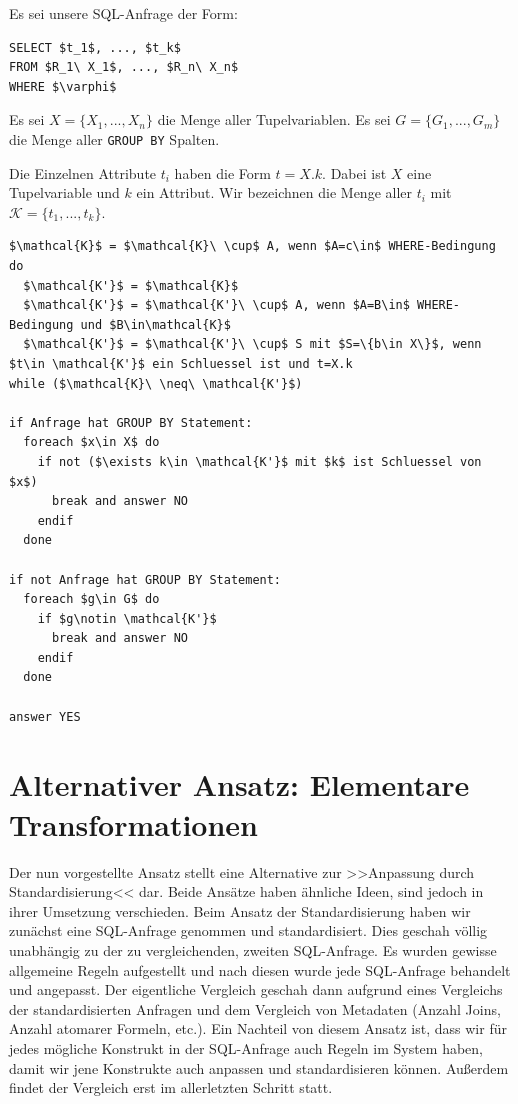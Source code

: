 Es sei unsere SQL-Anfrage der Form:

\begin{lstlisting}[mathescape]
SELECT $t_1$, ..., $t_k$
FROM $R_1\ X_1$, ..., $R_n\ X_n$
WHERE $\varphi$
\end{lstlisting}

Es sei $X=\{X_1, ..., X_n\}$ die Menge aller Tupelvariablen. Es sei $G=\{G_1, ..., G_m\}$ die Menge aller \verb|GROUP BY| Spalten.

Die Einzelnen Attribute $t_i$ haben die Form $t = X.k$. Dabei ist $X$ eine Tupelvariable und $k$ ein Attribut. Wir bezeichnen die Menge aller $t_i$ mit $\mathcal{K}=\{t_1,...,t_k\}$.

\begin{lstlisting}[mathescape]
$\mathcal{K}$ = $\mathcal{K}\ \cup$ A, wenn $A=c\in$ WHERE-Bedingung
do 
  $\mathcal{K'}$ = $\mathcal{K}$
  $\mathcal{K'}$ = $\mathcal{K'}\ \cup$ A, wenn $A=B\in$ WHERE-Bedingung und $B\in\mathcal{K}$
  $\mathcal{K'}$ = $\mathcal{K'}\ \cup$ S mit $S=\{b\in X\}$, wenn $t\in \mathcal{K'}$ ein Schluessel ist und t=X.k
while ($\mathcal{K}\ \neq\ \mathcal{K'}$)

if Anfrage hat GROUP BY Statement:
  foreach $x\in X$ do
    if not ($\exists k\in \mathcal{K'}$ mit $k$ ist Schluessel von $x$)
      break and answer NO
    endif
  done

if not Anfrage hat GROUP BY Statement:
  foreach $g\in G$ do
    if $g\notin \mathcal{K'}$
      break and answer NO
    endif
  done

answer YES
\end{lstlisting}

\section{Alternativer Ansatz: Elementare Transformationen}

Der nun vorgestellte Ansatz stellt eine Alternative zur >>Anpassung durch Standardisierung<< dar. Beide Ansätze haben ähnliche Ideen, sind jedoch in ihrer Umsetzung verschieden. Beim Ansatz der Standardisierung haben wir zunächst eine SQL-Anfrage genommen und standardisiert. Dies geschah völlig unabhängig zu der zu vergleichenden, zweiten SQL-Anfrage. Es wurden gewisse allgemeine Regeln aufgestellt und nach diesen wurde jede SQL-Anfrage behandelt und angepasst. Der eigentliche Vergleich geschah dann aufgrund eines Vergleichs der standardisierten Anfragen und dem Vergleich von Metadaten (Anzahl Joins, Anzahl atomarer Formeln, etc.). Ein Nachteil von diesem Ansatz ist, dass wir für jedes mögliche Konstrukt in der SQL-Anfrage auch Regeln im System haben, damit wir jene Konstrukte auch anpassen und standardisieren können. Außerdem findet der Vergleich erst im allerletzten Schritt statt.

